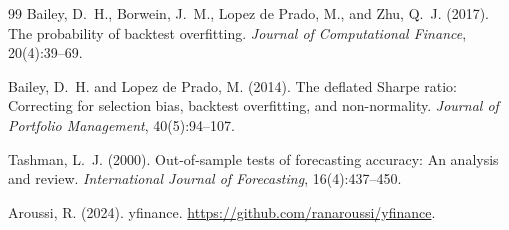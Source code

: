 \documentclass[11pt]{article}
\begin{document}
\begin{thebibliography}{99}
Bailey, D.~H., Borwein, J.~M., Lopez de Prado, M., and Zhu, Q.~J. (2017).
\newblock The probability of backtest overfitting.
\newblock \emph{Journal of Computational Finance}, 20(4):39--69.

Bailey, D.~H. and Lopez de Prado, M. (2014).
\newblock The deflated Sharpe ratio: Correcting for selection bias, backtest
overfitting, and non-normality.
\newblock \emph{Journal of Portfolio Management}, 40(5):94--107.

Tashman, L.~J. (2000).
\newblock Out-of-sample tests of forecasting accuracy: An analysis and review.
\newblock \emph{International Journal of Forecasting}, 16(4):437--450.

Aroussi, R. (2024).
\newblock yfinance.
\newblock \url{https://github.com/ranaroussi/yfinance}.

\end{thebibliography}
\end{document}
